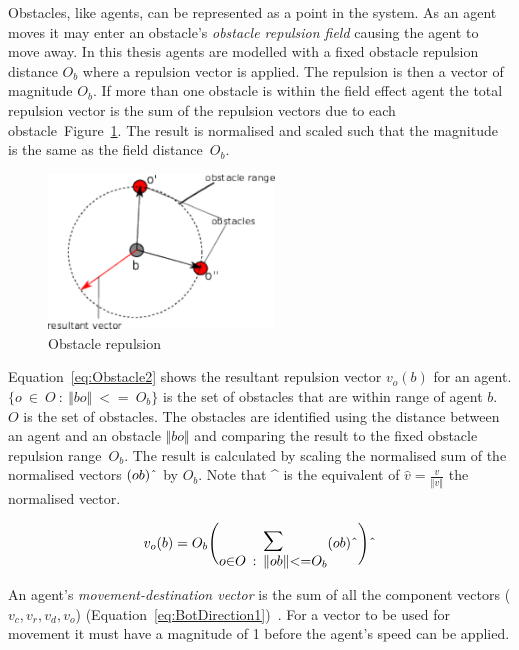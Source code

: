 \documentclass{ieeeaccess}
\newcommand{\magn}[1]{\Vert{#1}\Vert}
\begin{document}
Obstacles, like agents, can be represented as a point in the system. As an agent moves it may enter an obstacle's \textit{obstacle repulsion field} causing the agent to move away.
In this thesis agents are modelled with a fixed obstacle repulsion distance $O_b$ where a repulsion vector is applied. The repulsion is then a vector of magnitude $O_b$. If more than one obstacle is within the field effect agent the total repulsion vector is the sum of the repulsion vectors due to each obstacle~Figure~\ref{methods:Obstacle1}. The result is normalised and scaled such that the magnitude is the same as the field distance~$O_b$.
\begin{figure}[H]
\begin{center}
\includegraphics[width=6cm]{figures/Obstacle1}
\end{center}
\caption{Obstacle repulsion \label{methods:Obstacle1}}
\end{figure}

Equation~\ref{eq:Obstacle2} shows the resultant repulsion vector $v_o(b)$ for an agent. $\{o~\in~O~:~\magn{bo}~<=~O_b\}$ is the set of obstacles that are within range of agent $b$. $O$ is the set of obstacles. The obstacles are identified using the distance between an agent and an obstacle $\magn{bo}$ and comparing the result to the fixed obstacle repulsion range~$O_b$. The result is calculated by scaling the normalised sum of the normalised vectors $(ob)\string^$ by $O_b$. Note that \string^ is the equivalent of $\hat{v} = \frac{v}{\magn{v}}$ the normalised vector.

\begin{equation}\label{eq:Obstacle2}
v_o(b) =
 O_b\Bigg(\mathlarger{\mathlarger{\mathlarger{\sum}}}_{o \in O~:~\magn{ob} <= O_b}(ob)\string^\Bigg)\string^
\end{equation}

An agent's \textit{movement-destination vector} is the sum of all the component vectors ($v_c, v_r, v_d, v_o$) (Equation~\ref{eq:BotDirection1})~\cite{HAY:08}. For a vector to be used for movement it must have a magnitude of 1 before the agent's speed can be applied.
\end{document}
